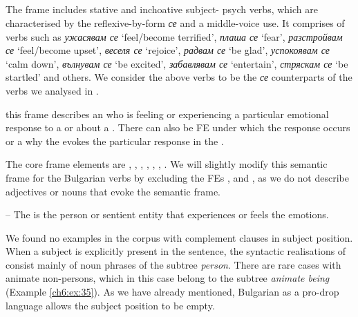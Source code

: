 \documentclass[output=paper,colorlinks,citecolor=brown]{langscibook}
\begin{document}
\subsection{}\label{ch6:sec:emdir}

The frame  includes stative and inchoative subject\hyp{} psych verbs, which are characterised by the reflexive-by-form \textit{се} and a middle-voice use. It comprises of verbs such as \textit{ужасявам се} `feel/become terrified', \textit{плаша се} `fear',\textit{ разстройвам се} `feel/become upset', \textit{веселя се} `rejoice', \textit{радвам се} `be glad', \textit{успокоявам се} `calm down', \textit{вълнувам се} `be excited', \textit{забав\-лявам се} `entertain', \textit{стряскам се} `be startled' and others. We consider the above verbs to be the \textit{се} counterparts of the verbs we analysed in .

 
\begin{description}[font=\normalfont]
\item[Definition:] this frame describes an  who is feeling or experiencing a particular emotional response to a  or about a . There can also be  FE under which the response occurs or a  why the  evokes the particular response in the .
\end{description}

The core frame elements are , , , , , , . We will slightly modify this semantic frame for the Bulgarian verbs by excluding the FEs ,  and , as we do not describe adjectives or nouns that evoke the semantic frame.

 -- The  is the person or sentient entity that experiences or feels the emotions. 

We found no examples in the corpus with complement clauses in subject position. When a subject is explicitly present in the sentence, the syntactic realisations of  consist mainly of noun phrases of the subtree \textit{person}. There are rare cases with animate non-persons, which in this case belong to the subtree \textit{animate being} (Example \ref{ch6:ex:35}). As we have already mentioned, Bulgarian as a pro-drop language allows the subject position to be empty.
\end{document}
